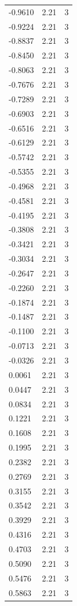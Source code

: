 \begin{longtable}{lrr}
  -0.9610 & 2.21 & 3 \\
  -0.9224 & 2.21 & 3 \\
  -0.8837 & 2.21 & 3 \\
  -0.8450 & 2.21 & 3 \\
  -0.8063 & 2.21 & 3 \\
  -0.7676 & 2.21 & 3 \\
  -0.7289 & 2.21 & 3 \\
  -0.6903 & 2.21 & 3 \\
  -0.6516 & 2.21 & 3 \\
  -0.6129 & 2.21 & 3 \\
  -0.5742 & 2.21 & 3 \\
  -0.5355 & 2.21 & 3 \\
  -0.4968 & 2.21 & 3 \\
  -0.4581 & 2.21 & 3 \\
  -0.4195 & 2.21 & 3 \\
  -0.3808 & 2.21 & 3 \\
  -0.3421 & 2.21 & 3 \\
  -0.3034 & 2.21 & 3 \\
  -0.2647 & 2.21 & 3 \\
  -0.2260 & 2.21 & 3 \\
  -0.1874 & 2.21 & 3 \\
  -0.1487 & 2.21 & 3 \\
  -0.1100 & 2.21 & 3 \\
  -0.0713 & 2.21 & 3 \\
  -0.0326 & 2.21 & 3 \\
  0.0061 & 2.21 & 3 \\
  0.0447 & 2.21 & 3 \\
  0.0834 & 2.21 & 3 \\
  0.1221 & 2.21 & 3 \\
  0.1608 & 2.21 & 3 \\
  0.1995 & 2.21 & 3 \\
  0.2382 & 2.21 & 3 \\
  0.2769 & 2.21 & 3 \\
  0.3155 & 2.21 & 3 \\
  0.3542 & 2.21 & 3 \\
  0.3929 & 2.21 & 3 \\
  0.4316 & 2.21 & 3 \\
  0.4703 & 2.21 & 3 \\
  0.5090 & 2.21 & 3 \\
  0.5476 & 2.21 & 3 \\
  0.5863 & 2.21 & 3 \\

\end{longtable}
